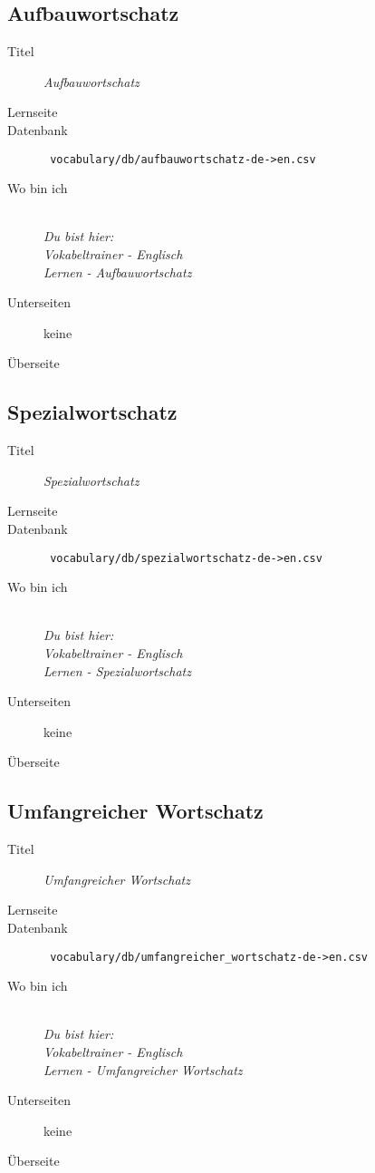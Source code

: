 \subsection{ Aufbauwortschatz }
\label{has:voc-learn-page2}
\begin{description}
	\item[Titel] \emph{ Aufbauwortschatz }
	\item[Lernseite] 
	\item[Datenbank] \texttt{ vocabulary/db/aufbauwortschatz-de->en.csv }
	\item[Wo bin ich] \emph{\\Du bist hier:\\Vokabeltrainer - Englisch\\Lernen - Aufbauwortschatz}
	\item[Unterseiten] keine
	\item[Überseite] 
\end{description}

\subsection{ Spezialwortschatz }
\label{has:voc-learn-page3}
\begin{description}
	\item[Titel] \emph{ Spezialwortschatz }
	\item[Lernseite] 
	\item[Datenbank] \texttt{ vocabulary/db/spezialwortschatz-de->en.csv }
	\item[Wo bin ich] \emph{\\Du bist hier:\\Vokabeltrainer - Englisch\\Lernen - Spezialwortschatz}
	\item[Unterseiten] keine
	\item[Überseite] 
\end{description}

\subsection{ Umfangreicher Wortschatz }
\label{has:voc-learn-page4}
\begin{description}
	\item[Titel] \emph{ Umfangreicher Wortschatz }
	\item[Lernseite] 
	\item[Datenbank] \texttt{ vocabulary/db/umfangreicher\_wortschatz-de->en.csv }
	\item[Wo bin ich] \emph{\\Du bist hier:\\Vokabeltrainer - Englisch\\Lernen - Umfangreicher Wortschatz}
	\item[Unterseiten] keine
	\item[Überseite] 
\end{description}

